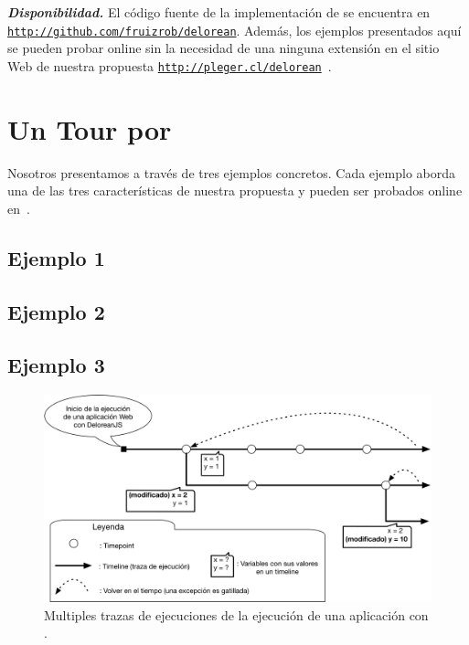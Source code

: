 \documentclass[conference]{IEEEtran}
\begin{document}
{\bf {\em Disponibilidad.}} El c\'odigo fuente de la implementaci\'on de \deloreanjs se encuentra en {\tt \url{http://github.com/fruizrob/delorean}}. Adem\'as, los ejemplos presentados aqu\'i se pueden probar online sin la necesidad de una ninguna extensi\'on en el sitio Web de nuestra propuesta {\tt \url{http://pleger.cl/delorean}}~\cite{deloreanjs}.

\section{Un Tour por \deloreanjs}
\label{sec:tour}

Nosotros presentamos \deloreanjs a trav\'es de tres ejemplos concretos. Cada ejemplo aborda una de las tres caracter\'isticas de nuestra propuesta y pueden ser probados online en~\cite{deloreanjs}.     



\subsection{Ejemplo 1}
\label{sec:tour1}


\subsection{Ejemplo 2}
\label{sec:tour2}


\subsection{Ejemplo 3}
\label{sec:tour3}


\bigskip

\begin{figure}[t]
\begin{center}
\includegraphics[width=.7\linewidth]{fig-timeline}
\caption{Multiples trazas de ejecuciones de la ejecuci\'on de una aplicaci\'on con \deloreanjs.}
\label{fig:timeline}
\end{center}
\end{figure}
\end{document}
